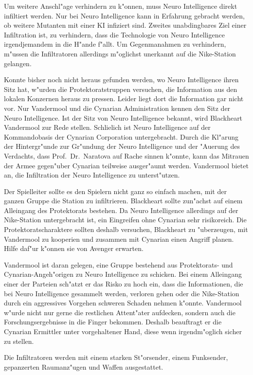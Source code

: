
Um weitere Anschl"age verhindern zu k"onnen, muss Neuro Intelligence direkt infiltiert werden. Nur bei Neuro Intelligence kann in Erfahrung gebracht werden, ob weitere Mutanten mit einer KI infiziert sind. Zweites unabdingbares Ziel einer Infiltration ist, zu verhindern, dass die Technologie von Neuro Intelligence irgendjemandem in die H"ande f"allt. Um Gegenma\3nahmen zu verhindern, m"ussen die Infiltratoren allerdings m"oglichst unerkannt auf die Nike-Station gelangen.

Konnte bisher noch nicht heraus gefunden werden, wo Neuro Intelligence ihren Sitz hat, w"urden die Protektoratstruppen versuchen, die Information aus den lokalen Konzernen heraus zu pressen. Leider liegt dort die Information gar nicht vor. Nur Vandermool und die Cynarian Administration kennen den Sitz der Neuro Intelligence. Ist der Sitz von Neuro Intelligence bekannt, wird Blackheart Vandermool zur Rede stellen. Schlie\3lich ist Neuro Intelligence auf der Kommandobasis der Cynarian Corporation untergebracht. Durch die Kl"arung der Hintergr"unde zur Gr"undung der Neuro Intelligence und der "Au\3erung des Verdachts, dass Prof.~Dr.~Naratova auf Rache sinnen k"onnte, kann das Mi\3trauen der Armee gegen"uber Cynarian teilweise ausger"aumt werden. Vandermool bietet an, die Infiltration der Neuro Intelligence zu unterst"utzen.

\begin{remarks}
	Der Spielleiter sollte es den Spielern nicht ganz so einfach machen, mit der ganzen Gruppe die Station zu infiltrieren. Blackheart sollte zun"achst auf einem Alleingang des Protektorats bestehen. Da Neuro Intelligence allerdings auf der Nike-Station untergebracht ist, ein Eingreifen ohne Cynarian sehr risikoreich. Die Protektoratscharaktere sollten deshalb versuchen, Blackheart zu "uberzeugen, mit Vandermool zu kooperien und zusammen mit Cynarian einen Angriff planen. Hilfe daf"ur k"onnen sie von Avenger erwarten.
	
	Vandermool ist daran gelegen, eine Gruppe bestehend aus Protektorats- und Cynarian-Angeh"origen zu Neuro Intelligence zu schicken. Bei einem Alleingang einer der Parteien sch"atzt er das Risko zu hoch ein, dass die Informationen, die bei Neuro Intelligence gesammelt werden, verloren gehen oder die Nike-Station durch ein aggressives Vorgehen schweren Schaden nehmen k"onnte. Vandermool w"urde nicht nur gerne die restlichen Attent"ater aufdecken, sondern auch die Forschungsergebnisse in die Finger bekommen. Deshalb beauftragt er die Cynarian Ermittler unter vorgehaltener Hand, diese wenn irgendm"oglich sicher zu stellen.
	
	Die Infiltratoren werden mit einem starken St"orsender, einem Funksender, gepanzerten Raumanz"ugen und Waffen ausgestattet.
\end{remarks}

